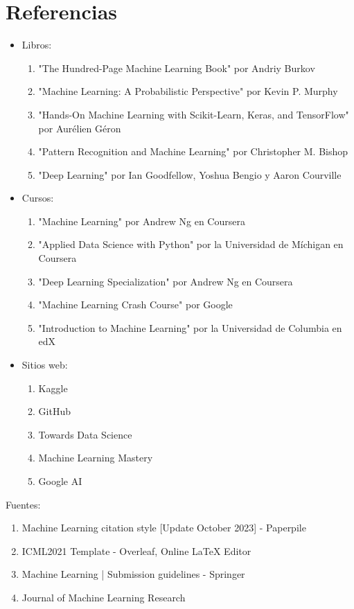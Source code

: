 \documentclass[12pt]{article}
\begin{document}
\section{Referencias}
\begin{itemize}
    \item Libros:
        \begin{enumerate}
            \item "The Hundred-Page Machine Learning Book" por Andriy Burkov
            \item "Machine Learning: A Probabilistic Perspective" por Kevin P. Murphy
            \item "Hands-On Machine Learning with Scikit-Learn, Keras, and TensorFlow" por Aurélien Géron
            \item "Pattern Recognition and Machine Learning" por Christopher M. Bishop
            \item "Deep Learning" por Ian Goodfellow, Yoshua Bengio y Aaron Courville
        \end{enumerate}
    \item Cursos:
        \begin{enumerate}
            \item "Machine Learning" por Andrew Ng en Coursera
            \item "Applied Data Science with Python" por la Universidad de Míchigan en Coursera
            \item "Deep Learning Specialization" por Andrew Ng en Coursera
            \item "Machine Learning Crash Course" por Google
            \item "Introduction to Machine Learning" por la Universidad de Columbia en edX
        \end{enumerate}
    \item Sitios web:
        \begin{enumerate}
            \item Kaggle
            \item GitHub
            \item Towards Data Science
            \item Machine Learning Mastery
            \item Google AI
        \end{enumerate}
\end{itemize}


Fuentes:
\begin{enumerate}
    \item Machine Learning citation style [Update October 2023] - Paperpile
    \item ICML2021 Template - Overleaf, Online LaTeX Editor
    \item Machine Learning | Submission guidelines - Springer
    \item Journal of Machine Learning Research
\end{enumerate}
\end{document}
